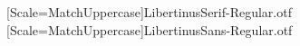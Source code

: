 [Scale=MatchUppercase]{LibertinusSerif-Regular.otf}
[Scale=MatchUppercase]{LibertinusSans-Regular.otf}

